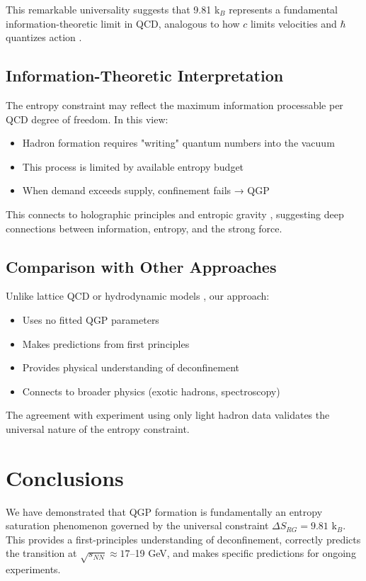 \documentclass[12pt,a4paper]{article}
\begin{document}
This remarkable universality suggests that 9.81 k$_B$ represents a fundamental information-theoretic limit in QCD, analogous to how $c$ limits velocities and $\hbar$ quantizes action \cite{Wheeler1990,Verlinde2011}.

\subsection{Information-Theoretic Interpretation}

The entropy constraint may reflect the maximum information processable per QCD degree of freedom. In this view:
\begin{itemize}
\item Hadron formation requires "writing" quantum numbers into the vacuum
\item This process is limited by available entropy budget
\item When demand exceeds supply, confinement fails → QGP
\end{itemize}

This connects to holographic principles \cite{Maldacena1998,Gubser2008} and entropic gravity \cite{Verlinde2011}, suggesting deep connections between information, entropy, and the strong force.

\subsection{Comparison with Other Approaches}

Unlike lattice QCD \cite{Borsanyi2014} or hydrodynamic models \cite{Heinz2013}, our approach:
\begin{itemize}
\item Uses no fitted QGP parameters
\item Makes predictions from first principles
\item Provides physical understanding of deconfinement
\item Connects to broader physics (exotic hadrons, spectroscopy)
\end{itemize}

The agreement with experiment using only light hadron data validates the universal nature of the entropy constraint.

\section{Conclusions}

We have demonstrated that QGP formation is fundamentally an entropy saturation phenomenon governed by the universal constraint $\Delta S_{RG} = 9.81$ k$_B$. This provides a first-principles understanding of deconfinement, correctly predicts the transition at $\sqrt{s_{NN}} \approx 17$--19 GeV, and makes specific predictions for ongoing experiments.
\end{document}

